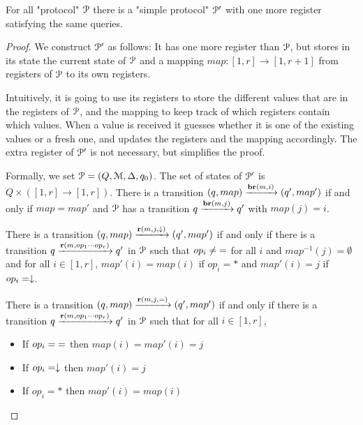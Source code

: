 \begin{lemma}
	\label{lem:simple-reduction}
	For all "protocol" $\mathcal{P}$ there is a "simple protocol" $\mathcal{P}'$ with one more register satisfying the same queries.
\end{lemma}

\begin{proof}
	
	We construct $\mathcal{P}'$ as follows: It has one more register than $\mathcal{P}$, but stores in its state the current state of $\mathcal{P}$ and a mapping $map : [1,r] \to [1,r+1]$ from registers of $\mathcal{P}$ to its own registers.
	
	Intuitively, it is going to use its registers to store the different values that are in the registers of $\mathcal{P}$, and the mapping to keep track of which registers contain which values.
	When a value is received it guesses whether it is one of the existing values or a fresh one, and updates the registers and the mapping accordingly.
	The extra register of $\mathcal{P}'$ is not necessary, but simplifies the proof.
	
	Formally, we set $\mathcal{P} = (Q, \mathcal{M}, \Delta, q_0)$. The set of states of $\mathcal{P}'$ is $Q \times ([1,r] \to [1,r])$. 
	There is a transition $(q, map) \xrightarrow{\textbf{br}(m, i)} (q', map')$ if and only if $map = map'$ and $\mathcal{P}$ has a transition $q \xrightarrow{\textbf{br}(m, j)} q'$ with $map(j) = i$.
	
	There is a transition $(q, map) \xrightarrow{\textbf{r}(m, j, \downarrow)} (q', map')$ if and only if there is a transition $q \xrightarrow{\textbf{r}(m, op_1\cdots op_r)} q'$ in $\mathcal{P}$ such that $op_i \neq {=}$ for all $i$ and $map^{-1}(j) =\emptyset$ and for all $i \in [1,r]$, $map'(i) = map(i)$ if $op_i = *$ and $map'(i) = j$ if $op_i = \downarrow$.
	
	There is a transition $(q, map) \xrightarrow{\textbf{r}(m, j, {=})} (q', map')$ if and only if there is a transition $q \xrightarrow{\textbf{r}(m, op_1\cdots op_r)} q'$ in $\mathcal{P}$ such that for all $i\in [1,r]$,
	\begin{itemize}
		\item If $op_i = {=}$ then $map(i) = map'(i) = j$
		
		\item If $op_i = \downarrow$ then $map'(i) = j$
		
		\item If $op_i = *$ then $map'(i)= map(i)$
	\end{itemize}
	

\end{proof}
